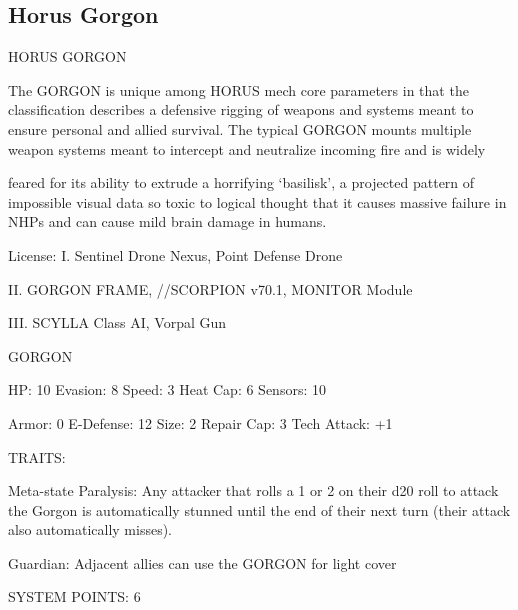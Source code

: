                                                                                                                
\subsection{Horus Gorgon}

                                                                                                                           
                                              HORUS GORGON  

The GORGON is unique among HORUS mech core parameters in that the classification describes a  
defensive rigging of weapons and systems meant to ensure personal and allied survival. The typical  
GORGON mounts multiple weapon systems meant to intercept and neutralize incoming fire and is widely  

feared for its ability to extrude a horrifying ‘basilisk’, a projected pattern of impossible visual data so toxic to  
logical thought that it causes massive failure in NHPs and can cause mild brain damage in humans.  

                                                                                                                      


                                                   License:  
I. Sentinel Drone Nexus, Point Defense Drone
 
II. GORGON FRAME,  //SCORPION v70.1, MONITOR Module
 
III. SCYLLA Class AI, Vorpal Gun
 

                                                 GORGON 

 HP: 10         Evasion: 8                            Speed: 3            Heat Cap: 6        Sensors: 10 

 Armor: 0       E-Defense: 12                         Size: 2             Repair Cap: 3      Tech Attack:  
                                                                                             +1 

                                                   TRAITS: 

 Meta-state Paralysis: Any attacker that rolls a 1 or 2 on their d20 roll to attack the Gorgon is  
 automatically stunned until the end of their next turn (their attack also automatically misses).
 
 Guardian: Adjacent allies can use the GORGON for light cover 

                                             SYSTEM POINTS: 6 


